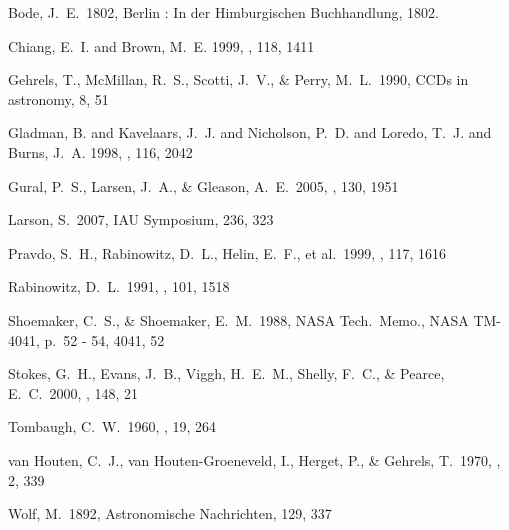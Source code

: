 \begin{thebibliography}{99}

 Bode, J.~E.\ 1802, Berlin : In 
der Himburgischen Buchhandlung, 1802.

 {Chiang}, E.~I. and {Brown}, M.~E. 1999,
      \aj, 118, 1411

 Gehrels, T., McMillan, 
R.~S., Scotti, J.~V., \& Perry, M.~L.\ 1990, CCDs in astronomy, 8, 51 

 {Gladman}, B. and {Kavelaars}, J.~J.
      and {Nicholson}, P.~D. and {Loredo}, T.~J. and {Burns}, J.~A. 1998, \aj,
      116, 2042

 Gural, P.~S., Larsen, 
J.~A., \& Gleason, A.~E.\ 2005, \aj, 130, 1951 

 Larson, S.\ 2007, IAU 
Symposium, 236, 323 

 Pravdo, S.~H., 
Rabinowitz, D.~L., Helin, E.~F., et al.\ 1999, \aj, 117, 1616 

 Rabinowitz, D.~L.\ 1991, 
\aj, 101, 1518 

 Shoemaker, C.~S., \& Shoemaker, E.~M.\ 1988, NASA Tech.~Memo., NASA TM-4041, p.~52 - 54, 4041, 52 

 Stokes, G.~H., Evans, 
J.~B., Viggh, H.~E.~M., Shelly, F.~C., \& Pearce, E.~C.\ 2000, \icarus, 148, 21 

 Tombaugh, C.~W.\ 1960, \skytel, 19, 264 

 van Houten, C.~J., van Houten-Groeneveld, I., Herget, P., \& Gehrels, T.\ 1970, \aaps, 2, 339 

 Wolf, M.\ 1892, Astronomische 
Nachrichten, 129, 337 

\end{thebibliography}
